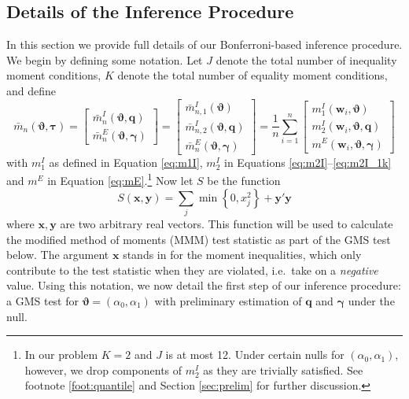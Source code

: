 \subsection{Details of the Inference Procedure}
\label{sec:details}
In this section we provide full details of our Bonferroni-based inference procedure.
We begin by defining some notation.
Let $J$ denote the total number of inequality moment conditions, $K$ denote the total number of equality moment conditions, and define
\begin{equation}
\bar{m}_n(\boldsymbol{\vartheta}, \boldsymbol{\tau}) = \left[
\begin{array}{c}
  \bar{m}_n^I(\boldsymbol{\vartheta}, \mathbf{q}) \\
  \bar{m}_n^E(\boldsymbol{\vartheta}, \boldsymbol{\gamma}) 
\end{array}
\right] = 
\left[
\begin{array}{l}
  \bar{m}_{n,1}^I(\boldsymbol{\vartheta})\\
  \bar{m}_{n,2}^I(\boldsymbol{\vartheta}, \mathbf{q}) \\
  \bar{m}_n^E(\boldsymbol{\vartheta}, \boldsymbol{\gamma}) 
\end{array}
\right] = 
\frac{1}{n} \sum_{i=1}^n
\left[\begin{array}{l}
    m^I_1(\mathbf{w}_i,\boldsymbol{\vartheta})\\
    m^I_2(\mathbf{w}_i,\boldsymbol{\vartheta}, \mathbf{q}) \\
    m^E(\mathbf{w}_i,\boldsymbol{\vartheta}, \boldsymbol{\gamma}) 
\end{array}\right]
\label{eq:mbar_def}
\end{equation}
with $m_1^I$ as defined in Equation \ref{eq:m1I}, $m_2^I$ in Equations \ref{eq:m2I}--\ref{eq:m2I_1k} and $m^E$ in Equation \ref{eq:mE}.\footnote{In our problem $K=2$ and $J$ is at most 12. Under certain nulls for $(\alpha_0, \alpha_1)$, however, we drop components of $m^I_2$ as they are trivially satisfied. See footnote \ref{foot:quantile} and Section \ref{sec:prelim} for further discussion.}
Now let $S$ be the function
\begin{equation}
  S(\mathbf{x}, \mathbf{y}) = \sum_{j}\min\left\{ 0, 
  x_j^2 \right\} + \mathbf{y}'\mathbf{y} 
    \label{eq:MMM}
\end{equation}
where $\mathbf{x}, \mathbf{y}$ are two arbitrary real vectors.
This function will be used to calculate the modified method of moments (MMM) test statistic as part of the GMS test below.
The argument $\mathbf{x}$ stands in for the moment inequalities, which only contribute to the test statistic when they are violated, i.e.\ take on a \emph{negative} value.
Using this notation, we now detail the first step of our inference procedure: a GMS test for $\boldsymbol{\vartheta} = (\alpha_0, \alpha_1)$ with preliminary estimation of $\mathbf{q}$ and $\boldsymbol{\gamma}$ under the null.


